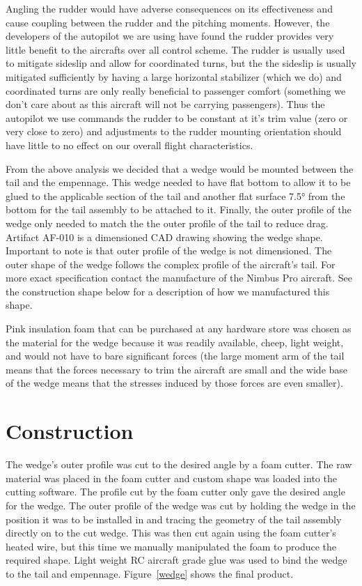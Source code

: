 \documentclass[]{auvsi_doc}
\begin{document}
 Angling the rudder would have adverse consequences on its effectiveness and cause coupling between the rudder and the pitching moments. However, the developers of the autopilot we are using have found the rudder provides very little benefit to the aircrafts over all control scheme. The rudder is usually used to mitigate sideslip and allow for coordinated turns, but the the sideslip is usually mitigated sufficiently by having a large horizontal stabilizer (which we do) and coordinated turns are only really beneficial to passenger comfort (something we don't care about as this aircraft will not be carrying passengers). Thus the autopilot we use commands the rudder to be constant at it's trim value (zero or very close to zero) and adjustments to the rudder mounting orientation should have little to no effect on our overall flight characteristics.
 
 From the above analysis we decided that a wedge would be mounted between the tail and the empennage. This wedge needed to have flat bottom to allow it to be glued to the applicable section of the tail and another flat surface 7.5° from the bottom for the tail assembly to be attached to it. Finally, the outer profile of the wedge only needed to match the the outer profile of the tail to reduce drag. Artifact AF-010 is a dimensioned CAD drawing showing the wedge shape. Important to note is that outer profile of the wedge is not dimensioned. The outer shape of the wedge follows the complex profile of the aircraft's tail. For more exact specification contact the manufacture of the Nimbus Pro aircraft. See the construction shape below for a description of how we manufactured this shape. 
 
Pink insulation foam that can be purchased at any hardware store was chosen as the material for the wedge because it was readily available, cheep, light weight, and would not have to bare significant forces (the large moment arm of the tail means that the forces necessary to trim the aircraft are small and the wide base of the wedge means that the stresses induced by those forces are even smaller). 

\section{Construction}

The wedge's outer profile was cut to the desired angle by a foam cutter. The raw material was placed in the foam cutter and custom shape was loaded into the cutting software. The profile cut by the foam cutter only gave the desired angle for the wedge. The outer profile of the wedge was cut by holding the wedge in the position it was to be installed in and tracing the geometry of the tail assembly directly on to the cut wedge. This was then cut again using the foam cutter's heated wire, but this time we manually manipulated the foam to produce the required shape. Light weight RC aircraft grade glue was used to bind the wedge to the tail and empennage. Figure~\ref{wedge} shows the final product.
\end{document}
